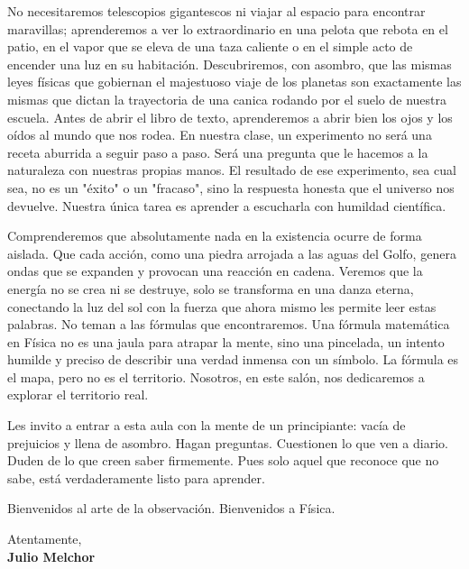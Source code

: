 \documentclass[11pt]{report}
\begin{document}
\begin{titlepage}
\vspace{0.7em}

No necesitaremos telescopios gigantescos ni viajar al espacio para encontrar maravillas; aprenderemos a ver lo extraordinario en una pelota que rebota en el patio, en el vapor que se eleva de una taza caliente o en el simple acto de encender una luz en su habitación. Descubriremos, con asombro, que las mismas leyes físicas que gobiernan el majestuoso viaje de los planetas son exactamente las mismas que dictan la trayectoria de una canica rodando por el suelo de nuestra escuela. Antes de abrir el libro de texto, aprenderemos a abrir bien los ojos y los oídos al mundo que nos rodea. En nuestra clase, un experimento no será una receta aburrida a seguir paso a paso. Será una pregunta que le hacemos a la naturaleza con nuestras propias manos. El resultado de ese experimento, sea cual sea, no es un "éxito" o un "fracaso", sino la respuesta honesta que el universo nos devuelve. Nuestra única tarea es aprender a escucharla con humildad científica.

\vspace{0.7em}

Comprenderemos que absolutamente nada en la existencia ocurre de forma aislada. Que cada acción, como una piedra arrojada a las aguas del Golfo, genera ondas que se expanden y provocan una reacción en cadena. Veremos que la energía no se crea ni se destruye, solo se transforma en una danza eterna, conectando la luz del sol con la fuerza que ahora mismo les permite leer estas palabras. No teman a las fórmulas que encontraremos. Una fórmula matemática en Física no es una jaula para atrapar la mente, sino una pincelada, un intento humilde y preciso de describir una verdad inmensa con un símbolo. La fórmula es el mapa, pero no es el territorio. Nosotros, en este salón, nos dedicaremos a explorar el territorio real.

\vspace{0.7em}

Les invito a entrar a esta aula con la mente de un principiante: vacía de prejuicios y llena de asombro. Hagan preguntas. Cuestionen lo que ven a diario. Duden de lo que creen saber firmemente. Pues solo aquel que reconoce que no sabe, está verdaderamente listo para aprender.

\vspace{0.7em}

Bienvenidos al arte de la observación. Bienvenidos a Física.

\vspace{0.7em}

\raggedright Atentamente,\\
\textbf{Julio Melchor}

\end{titlepage}
\end{document}
